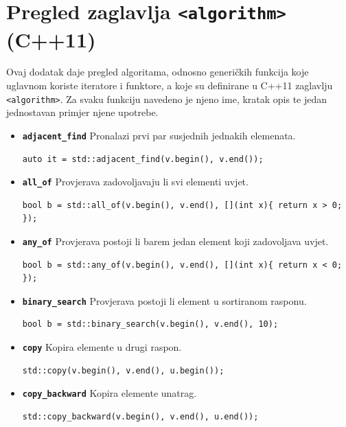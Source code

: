 \appendix
\chapter{Pregled zaglavlja \texttt{<algorithm>} (C++11)}
Ovaj dodatak daje pregled algoritama,
odnosno generičkih funkcija koje uglavnom koriste iteratore i funktore,
a koje su definirane u C++11 zaglavlju \texttt{<algorithm>}.
Za svaku funkciju navedeno je njeno ime, kratak opis
te jedan jednostavan primjer njene upotrebe.

\begin{itemize}
\item \textbf{\texttt{adjacent\_find}}\newline
Pronalazi prvi par susjednih jednakih elemenata.
\begin{verbatim}
auto it = std::adjacent_find(v.begin(), v.end());
\end{verbatim}

\item \textbf{\texttt{all\_of}}\newline
Provjerava zadovoljavaju li svi elementi uvjet.
\begin{verbatim}
bool b = std::all_of(v.begin(), v.end(), [](int x){ return x > 0; });
\end{verbatim}

\item \textbf{\texttt{any\_of}}\newline
Provjerava postoji li barem jedan element koji zadovoljava uvjet.
\begin{verbatim}
bool b = std::any_of(v.begin(), v.end(), [](int x){ return x < 0; });
\end{verbatim}

\item \textbf{\texttt{binary\_search}}\newline
Provjerava postoji li element u sortiranom rasponu.
\begin{verbatim}
bool b = std::binary_search(v.begin(), v.end(), 10);
\end{verbatim}

\item \textbf{\texttt{copy}}\newline
Kopira elemente u drugi raspon.
\begin{verbatim}
std::copy(v.begin(), v.end(), u.begin());
\end{verbatim}

\item \textbf{\texttt{copy\_backward}}\newline
Kopira elemente unatrag.
\begin{verbatim}
std::copy_backward(v.begin(), v.end(), u.end());
\end{verbatim}


\end{itemize}
